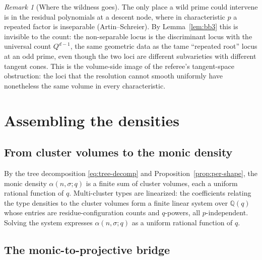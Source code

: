 \documentclass[pdflatex,sn-mathphys-num]{sn-jnl}%
\newcommand{\bbQ}{\mathbb{Q}}
\theoremstyle{plain}
\theoremstyle{definition}
\theoremstyle{remark}
\newtheorem{remark}[theorem]{Remark}
\numberwithin{equation}{section}
\begin{document}
\begin{remark}[Where the wildness goes]\label{rem:wild-absorbed}
The only place a wild prime could intervene is in the residual polynomials at a
descent node, where in characteristic $p$ a repeated factor is inseparable
(Artin--Schreier). By Lemma~\ref{lem:bb3} this is invisible to the count: the
non-separable locus is the discriminant locus with the universal count $Q^{d-1}$,
the same geometric data as the tame ``repeated root'' locus at an odd prime, even
though the two loci are different subvarieties with different tangent cones. This
is the volume-side image of the referee's tangent-space obstruction: the loci that
the resolution cannot smooth uniformly have nonetheless the same volume in every
characteristic.
\end{remark}

\section{Assembling the densities}\label{sec:assemble}

\subsection{From cluster volumes to the monic density}\label{sec:linear-system}

By the tree decomposition \eqref{eq:tree-decomp} and Proposition~\ref{prop:per-shape},
the monic density $\alpha(n,\sigma;q)$ is a finite sum of cluster volumes, each a
uniform rational function of $q$. Multi-cluster types are linearized: the
coefficients relating the type densities to the cluster volumes form a finite
linear system over $\bbQ(q)$ whose entries are residue-configuration counts and
$q$-powers, all $p$-independent. Solving the system expresses $\alpha(n,\sigma;q)$
as a uniform rational function of $q$.

\subsection{The monic-to-projective bridge}\label{sec:bridge}
\end{document}
